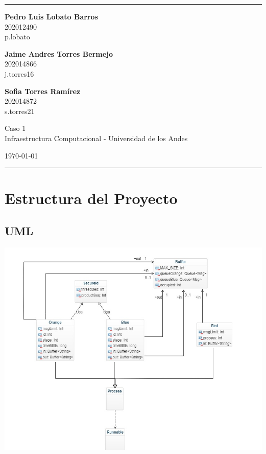 \documentclass[a4paper]{article}
\begin{document}

    \fancyhead[C]{}
    \hrule \medskip %
    \begin{minipage}{0.295\textwidth}
        \raggedright
        \footnotesize
        \textbf{Pedro Luis Lobato Barros} \hfill\\
        202012490\hfill\\
        p.lobato

        \textbf{Jaime Andres Torres Bermejo} \hfill\\
        202014866\hfill\\
        j.torres16

        \textbf{Sofia Torres Ram\'irez} \hfill\\
        202014872\hfill\\
        s.torres21

    \end{minipage}
    \begin{minipage}{0.4\textwidth}
        \centering
        \large
        Caso 1\\
        \normalsize
        Infraestructura Computacional - Universidad de los Andes\\
    \end{minipage}
    \begin{minipage}{0.295\textwidth}
        \raggedleft
        \today\hfill\\
    \end{minipage}
    \medskip\hrule
    \bigskip



    \section{Estructura del Proyecto}

    \subsection{UML}
    \begin{center}
        \includegraphics[scale=0.5]{uml.jpeg}    
    \end{center}
    
\end{document}
